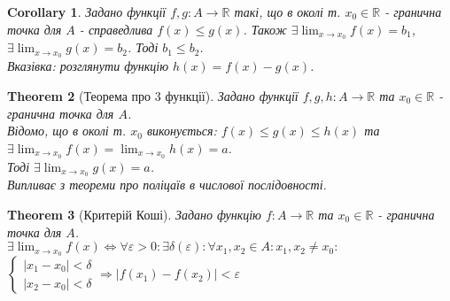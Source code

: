 \documentclass[a4paper, 14pt]{article}
\def\huge{\displaystyle}
\theoremstyle{theoremdd}
\newtheorem{theorem}{Theorem}[subsection]
\theoremstyle{theoremdd}
\theoremstyle{theoremdd}
\theoremstyle{theoremdd}
\theoremstyle{theoremdd}
\theoremstyle{theoremdd}
\theoremstyle{theoremdd}
\theoremstyle{theoremdd}
\newtheorem{corollary}[theorem]{Corollary}
\begin{document}
	\begin{corollary}
	Задано функції $f,g: A \to \mathbb{R}$ такі, що в околі т. $x_0 \in \mathbb{R}$ - гранична точка для $A$ - справедлива $f(x) \leq g(x)$. Також $\exists \huge \lim_{x \to x_0} f(x) = b_1$, $\exists \huge \lim_{x \to x_0} g(x) = b_2$. Тоді $b_1 \leq b_2$.\\
\textit{Вказівка: розглянути функцію} $h(x) = f(x) - g(x)$.
	\end{corollary}
	
	\begin{theorem}[Теорема про 3 функції]
Задано функції $f,g,h: A \to \mathbb{R}$ та $x_0 \in \mathbb{R}$ - гранична точка для $A$.\\
Відомо, що в околі т. $x_0$ виконується: $f(x) \leq g(x) \leq h(x)$ та $\exists \huge \lim_{x \to x_0} f(x) = \lim_{x \to x_0} h(x) = a$.\\
Тоді $\exists \huge \lim_{x \to x_0} g(x) = a$.\\
\textit{Випливає з теореми про поліцаїв в числової послідовності.}
	\end{theorem}
	
	\begin{theorem}[Критерій Коші]
Задано функцію $f: A \to \mathbb{R}$ та $x_0 \in \mathbb{R}$ - гранична точка для $A$.\\
$\exists \huge \lim_{x \to x_0} f(x) \iff \forall \varepsilon > 0: \exists \delta(\varepsilon): \forall x_1,x_2 \in A: x_1,x_2 \neq x_0:$ 
$\begin{cases} |x_1-x_0|<\delta \\ |x_2-x_0|<\delta \end{cases} \Rightarrow |f(x_1)-f(x_2)|<\varepsilon
$
	\end{theorem}
	
\end{document}
